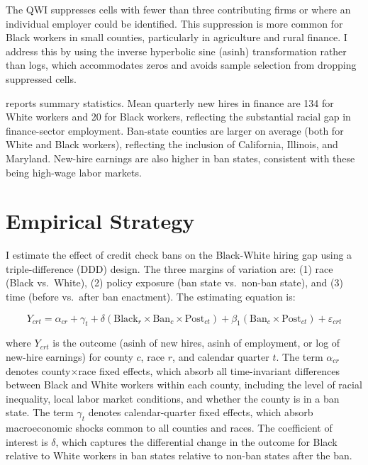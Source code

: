 \documentclass[12pt]{article}
\begin{document}
The QWI suppresses cells with fewer than three contributing firms or where an individual employer could be identified. This suppression is more common for Black workers in small counties, particularly in agriculture and rural finance. I address this by using the inverse hyperbolic sine (asinh) transformation rather than logs, which accommodates zeros and avoids sample selection from dropping suppressed cells.



 reports summary statistics. Mean quarterly new hires in finance are 134 for White workers and 20 for Black workers, reflecting the substantial racial gap in finance-sector employment. Ban-state counties are larger on average (both for White and Black workers), reflecting the inclusion of California, Illinois, and Maryland. New-hire earnings are also higher in ban states, consistent with these being high-wage labor markets.

\section{Empirical Strategy}
\label{sec:strategy}

I estimate the effect of credit check bans on the Black-White hiring gap using a triple-difference (DDD) design. The three margins of variation are: (1) race (Black vs.\ White), (2) policy exposure (ban state vs.\ non-ban state), and (3) time (before vs.\ after ban enactment). The estimating equation is:

\begin{equation}
Y_{crt} = \alpha_{cr} + \gamma_t + \delta (\text{Black}_r \times \text{Ban}_c \times \text{Post}_{ct}) + \beta_1 (\text{Ban}_c \times \text{Post}_{ct}) + \varepsilon_{crt}
\label{eq:ddd}
\end{equation}

\noindent where $Y_{crt}$ is the outcome (asinh of new hires, asinh of employment, or log of new-hire earnings) for county $c$, race $r$, and calendar quarter $t$. The term $\alpha_{cr}$ denotes county$\times$race fixed effects, which absorb all time-invariant differences between Black and White workers within each county, including the level of racial inequality, local labor market conditions, and whether the county is in a ban state. The term $\gamma_t$ denotes calendar-quarter fixed effects, which absorb macroeconomic shocks common to all counties and races. The coefficient of interest is $\delta$, which captures the differential change in the outcome for Black relative to White workers in ban states relative to non-ban states after the ban.
\end{document}
